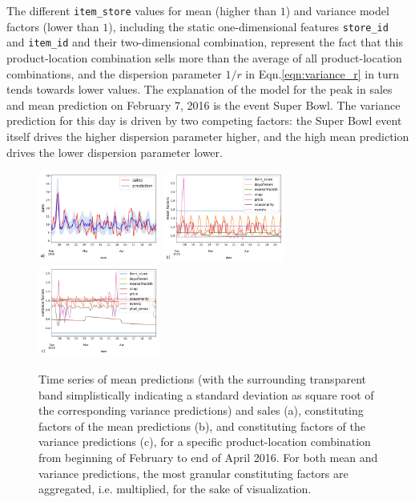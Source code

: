 \documentclass[BCOR=1mm, DIV=calc,10pt,
twoside=true,
twocolumn,
headings=normal]{scrartcl}
\newcommand{\eqn}{Eqn.}
\begin{document}
\noindent
The different \texttt{item\_store} values for mean (higher than $1$) and variance model factors (lower than $1$), including the static one-dimensional features \texttt{store\_id} and \texttt{item\_id} and their two-dimensional combination, represent the fact that this product-location combination sells more than the average of all product-location combinations, and the dispersion parameter $1/r$ in \eqn \eqref{eqn:variance_r} in turn tends towards lower values. The explanation of the model for the peak in sales and mean prediction on February 7, 2016 is the event Super Bowl. The variance prediction for this day is driven by two competing factors:  the Super Bowl event itself drives  the  higher dispersion parameter higher, and the high mean prediction drives the lower dispersion parameter lower.

\begin{figure}
\begin{center}
\includegraphics[width=4cm]{../figures/ts_item_16_store_6}
\includegraphics[width=4cm]{../figures/factors_ts}
\includegraphics[width=4cm]{../figures/factors_ts_width}
\caption{\label{fig:factor_plots} Time series of mean predictions (with the surrounding transparent band simplistically indicating a standard deviation as square root of the corresponding variance predictions) and sales (a), constituting factors of the mean predictions (b), and constituting factors of the variance predictions (c), for a specific product-location combination from beginning of February to end of April 2016. For both mean and variance predictions, the most granular constituting factors are aggregated, i.e. multiplied, for the sake of visualization.}
\end{center}
\end{figure}
\end{document}
